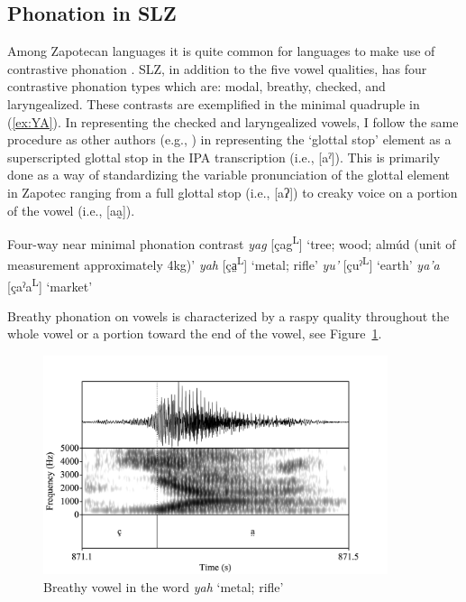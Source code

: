 \documentclass[12pt, letterpaper]{article}
\newcommand{\supr}[1]{\textsuperscript{#1}}
\begin{document}
\subsection{Phonation in SLZ} \label{sec:Phonation}

Among Zapotecan languages it is quite common for languages to make use of contrastive phonation \citep[e.g.,][]{avelinobecerraTopicsYalalagZapotec2004,longDiccionarioZapotecoSan2005,avelinoAcousticElectroglottographicAnalyses2010,lopeznicolasEstudiosFonologiaGramatica2016,chavez-peonInteractionMetricalStructure2010}. 
SLZ, in addition to the five vowel qualities, has four contrastive phonation types which are: modal, breathy, checked, and laryngealized. These contrasts are exemplified in the minimal quadruple in (\ref{ex:YA}). In representing the checked and laryngealized vowels, I follow the same procedure as other authors (e.g., \citet{avelinoAcousticElectroglottographicAnalyses2010, uchiharaToneRegistrogenesisQuiavini2016}) in representing the `glottal stop' element as a superscripted glottal stop in the IPA transcription (i.e., [aˀ]). This is primarily done as a way of standardizing the variable pronunciation of the glottal element in Zapotec ranging from a full glottal stop (i.e., [aʔ]) to creaky voice on a portion of the vowel (i.e., [aa̰]).  

\ea \label{ex:YA} Four-way near minimal phonation contrast
	\ea \textit{yag}  [çag\supr{L}] `tree; wood; almúd (unit of measurement approximately 4kg)'
	\ex \textit{yah}  [ça̤\supr{L}] `metal; rifle'
	\ex \textit{yu'}  [çuˀ\supr{L}]  `earth'
	\ex \textit{ya'a}  [çaˀa\supr{L}]  `market'
	\z 
\z 

Breathy phonation on vowels is characterized by a raspy quality throughout the whole vowel or a portion toward the end of the vowel, see Figure~\ref{fig:BreathyVowel}. 

\begin{figure}[!h]
	\centering
	\includegraphics[width=0.9\textwidth]{../yah.png}
	\caption{Breathy vowel in the word \textit{yah} `metal; rifle'}
	\label{fig:BreathyVowel}
\end{figure}
\end{document}
